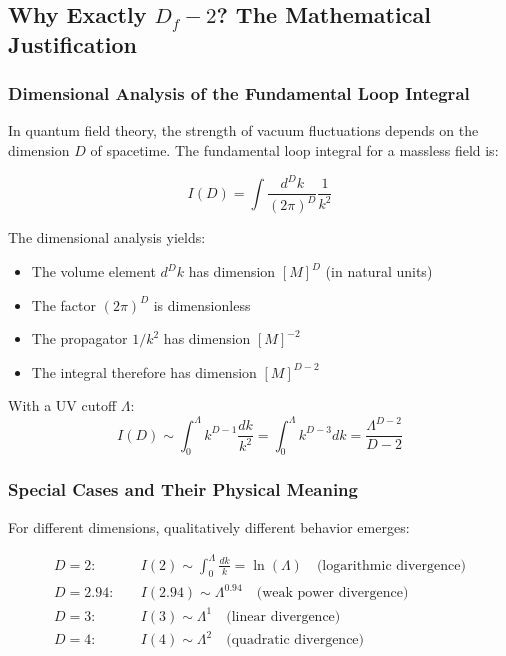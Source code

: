 \documentclass[12pt,a4paper]{article}
\theoremstyle{definition}
\begin{document}
	\subsection{Why Exactly $D_f - 2$? The Mathematical Justification}
	
	\subsubsection{Dimensional Analysis of the Fundamental Loop Integral}
	
	In quantum field theory, the strength of vacuum fluctuations depends on the dimension $D$ of spacetime. The fundamental loop integral for a massless field is:
	
	\begin{equation}
		I(D) = \int \frac{d^D k}{(2\pi)^D} \frac{1}{k^2}
	\end{equation}
	
	The dimensional analysis yields:
	\begin{itemize}
		\item The volume element $d^D k$ has dimension $[M]^D$ (in natural units)
		\item The factor $(2\pi)^D$ is dimensionless
		\item The propagator $1/k^2$ has dimension $[M]^{-2}$
		\item The integral therefore has dimension $[M]^{D-2}$
	\end{itemize}
	
	With a UV cutoff $\Lambda$:
	\begin{equation}
		I(D) \sim \int_0^{\Lambda} k^{D-1} \frac{dk}{k^2} = \int_0^{\Lambda} k^{D-3} dk = \frac{\Lambda^{D-2}}{D-2}
	\end{equation}
	
	\subsubsection{Special Cases and Their Physical Meaning}
	
	For different dimensions, qualitatively different behavior emerges:
	
	\begin{align}
		D = 2: \quad &I(2) \sim \int_0^{\Lambda} \frac{dk}{k} = \ln(\Lambda) \quad \text{(logarithmic divergence)}\\
		D = 2.94: \quad &I(2.94) \sim \Lambda^{0.94} \quad \text{(weak power divergence)}\\
		D = 3: \quad &I(3) \sim \Lambda^{1} \quad \text{(linear divergence)}\\
		D = 4: \quad &I(4) \sim \Lambda^{2} \quad \text{(quadratic divergence)}
	\end{align}
	
\end{document}
